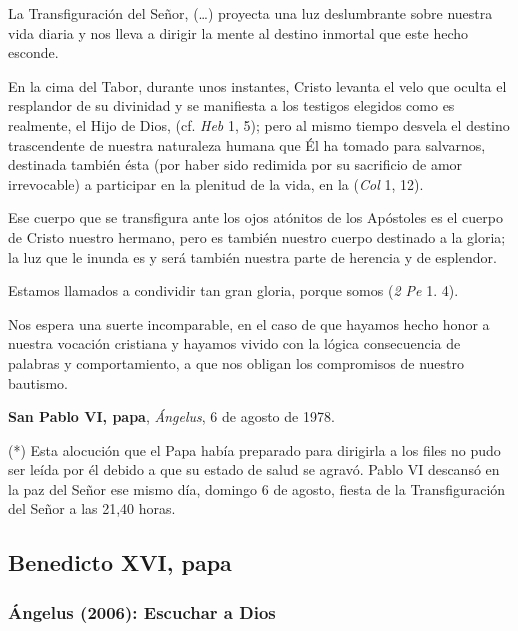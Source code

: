 \begin{patercite}
La Transfiguración del Señor, (\ldots)  proyecta una luz deslumbrante sobre nuestra vida diaria y nos lleva a dirigir la mente al destino inmortal que este hecho esconde.

En la cima del Tabor, durante unos instantes, Cristo levanta el velo que oculta el resplandor de su divinidad y se manifiesta a los testigos elegidos como es realmente, el Hijo de Dios,  (cf. \textit{Heb} 1, 5); pero al mismo tiempo desvela el destino trascendente de nuestra naturaleza humana que Él ha tomado para salvarnos, destinada también ésta (por haber sido redimida por su sacrificio de amor irrevocable) a participar en la plenitud de la vida, en la  (\textit{Col} 1, 12).

Ese cuerpo que se transfigura ante los ojos atónitos de los Apóstoles es el cuerpo de Cristo nuestro hermano, pero es también nuestro cuerpo destinado a la gloria; la luz que le inunda es y será también nuestra parte de herencia y de esplendor.

Estamos llamados a condividir tan gran gloria, porque somos  (\textit{2 Pe} 1. 4).

Nos espera una suerte incomparable, en el caso de que hayamos hecho honor a nuestra vocación cristiana y hayamos vivido con la lógica
consecuencia de palabras y comportamiento, a que nos obligan los compromisos de nuestro bautismo.

\textbf{San Pablo VI, papa}, \textit{Ángelus}, 6 de agosto de 1978.

\tiny{(*) Esta alocución que el Papa había preparado para dirigirla a los files no pudo ser leída por él debido a que su estado de salud se agravó. Pablo VI descansó en la paz del Señor ese mismo día, domingo 6 de agosto, fiesta de la Transfiguración del Señor a las 21,40 horas.}
\end{patercite}
\label{b2-03-02-2000H}

\newsection
\subsection{Benedicto XVI, papa}

\subsubsection{Ángelus (2006): Escuchar a Dios}

